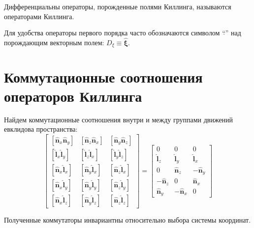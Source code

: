 \documentclass[12pt,a4paper]{article}
\newcommand{\V}[1]{\mathbf{#1}}
\newcommand{\Op}[1]{\hat{\V{#1}}}
\begin{document}
            Дифференциальны операторы, порожденные полями Киллинга, называются операторами Киллинга.

            Для удобства операторы первого порядка часто обозначаются символом \enquote{$\hat{ }$} над порождающим векторным полем: $D_\xi \equiv \Op\xi$.


    \section{Коммутационные соотношения операторов Киллинга}

        Найдем коммутационные соотношения внутри и между группами движений евклидова пространства:
        \begin{equation}
            \begin{bmatrix}
                [ \Op{n}_x \Op{n}_y ] & [ \Op{n}_z \Op{n}_x ] & [ \Op{n}_y \Op{n}_z ] \\
                [ \Op{l}_x \Op{l}_y ] & [ \Op{l}_z \Op{l}_x ] & [ \Op{l}_y \Op{l}_z ] \\
                [ \Op{n}_x \Op{l}_x ] & [ \Op{n}_y \Op{l}_x ] & [ \Op{n}_z \Op{l}_x ] \\
                [ \Op{n}_x \Op{l}_y ] & [ \Op{n}_y \Op{l}_y ] & [ \Op{n}_z \Op{l}_y ] \\
                [ \Op{n}_x \Op{l}_z ] & [ \Op{n}_y \Op{l}_z ] & [ \Op{n}_z \Op{l}_z ]
            \end{bmatrix}
            =
            \begin{bmatrix}
                0          &   0        &   0        \\
                  \Op{l}_z &   \Op{l}_y &   \Op{l}_x \\
                0          &   \Op{n}_z & - \Op{n}_y \\
                - \Op{n}_z &   0        &   \Op{n}_x \\
                  \Op{n}_y & - \Op{n}_x &   0
            \end{bmatrix}
        \end{equation}

        Полученные коммутаторы инвариантны относительно выбора системы координат.
\end{document}
